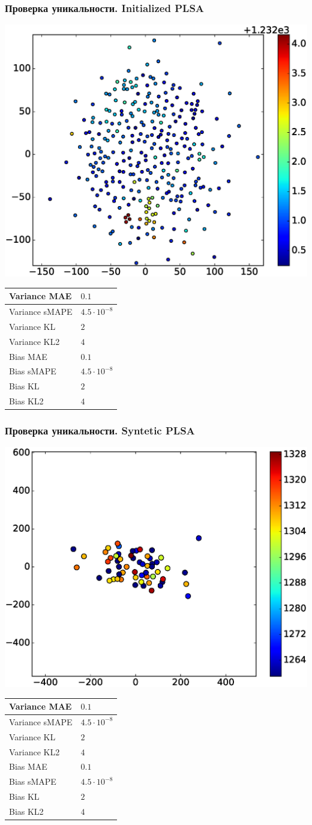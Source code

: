 \documentclass[utf8]{beamer}
\begin{document}
	
	\begin{frame}	
	\frametitle{Проверка уникальности. Initialized PLSA}
	 \includegraphics[width=0.5\linewidth]{presentation_pictures/full_initialized_plsa.eps} 
    \begin{tabular}[b]{| l | l | }\hline
      Variance MAE & $0.1$ \\ \hline
      Variance sMAPE  & $4.5 \cdot 10^{-8}$ \\ \hline
      Variance KL  & $2$ \\ \hline
      Variance KL2  & $4$ \\ \hline

      Bias MAE & $0.1$ \\ \hline
      Bias sMAPE  & $4.5 \cdot 10^{-8}$ \\ \hline
      Bias KL  & $2$ \\ \hline
      Bias KL2  & $4$ \\ \hline
    \end{tabular}

	\end{frame}
	
	
	\begin{frame}	
	\frametitle{Проверка уникальности. Syntetic PLSA}
	 \includegraphics[width=0.5\linewidth]{presentation_pictures/syntetic_plsa.eps} 
    \begin{tabular}[b]{| l | l | }\hline
      Variance MAE & $0.1$ \\ \hline
      Variance sMAPE  & $4.5 \cdot 10^{-8}$ \\ \hline
      Variance KL  & $2$ \\ \hline
      Variance KL2  & $4$ \\ \hline

      Bias MAE & $0.1$ \\ \hline
      Bias sMAPE  & $4.5 \cdot 10^{-8}$ \\ \hline
      Bias KL  & $2$ \\ \hline
      Bias KL2  & $4$ \\ \hline
    \end{tabular}

	\end{frame}
	
\end{document}
